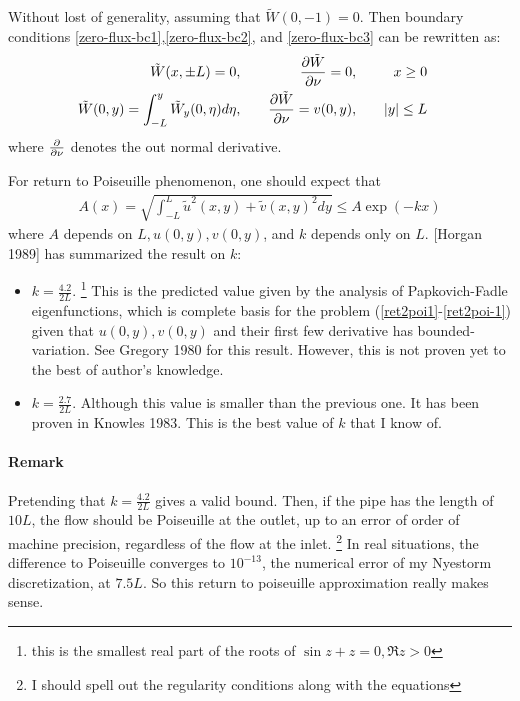 \documentclass[11pt]{article}
\newtheorem[L]{thm}{Theorem}[section]
\begin{document}
Without lost of generality, assuming that $\tilde W(0,-1) = 0$. Then
 boundary conditions \eqref{zero-flux-bc1},\eqref{zero-flux-bc2}, and \eqref{zero-flux-bc3} can be rewritten as:
 \begin{align}
    \tilde W(x,\pm L) = 0, \quad &&
      \pdv{\tilde W}{\nu} (x,\pm L) = 0, \quad  &&
      x\ge 0 &&\\
    \tilde W(0,y) = \int_{-L}^y \tilde{W}_y(0,\eta)d\eta, \quad &&
      \pdv{\tilde W}{\nu} (0,y) = v(0,y), \quad &&
      |y|\le L \label{ret2poi-1}
 \end{align}where $\pdv \nu$ denotes the out normal derivative. 

For return to Poiseuille phenomenon, one should expect that 
\begin{align}
  A(x) = \sqrt{\int_{-L}^L\tilde u^2(x,y)+\tilde v(x,y)^2 dy} \le A\exp(-kx)
\end{align} 
where $A$ depends on $L, u(0,y), v(0,y)$, and $k$ depends only on $L$. [Horgan 1989] has summarized the result on $k$:
\begin{itemize}
  \item $k = \frac{4.2}{2L}$. \footnote{this is the smallest real part of the roots of $\sin z + z = 0, \Re z > 0$} This is the predicted value given by the analysis of Papkovich-Fadle eigenfunctions, which is complete basis for the problem (\ref{ret2poi1}-\ref{ret2poi-1}) given that $u(0,y),v(0,y)$ and their first few derivative has bounded-variation. See Gregory 1980 for this result. However, this is not proven yet to the best of author's knowledge. 
  \item $k= \frac{2.7}{2L}$. Although this value is smaller than the previous one. It has been proven in Knowles 1983. This is the best value of $k$ that I know of. 
\end{itemize}


\paragraph{Remark} Pretending that $k=\frac{4.2}{2L}$ gives a valid bound. Then, if the pipe has the length of $10L$, the flow should be Poiseuille at the outlet, up to an error of order of machine precision, regardless of the flow at the inlet. \footnote{I should spell out the regularity conditions along with the equations} In real situations, the difference to Poiseuille converges to $10^{-13}$, the numerical error of my Nyestorm discretization, at $7.5L$. So this return to poiseuille approximation really makes sense. 
\end{document}
